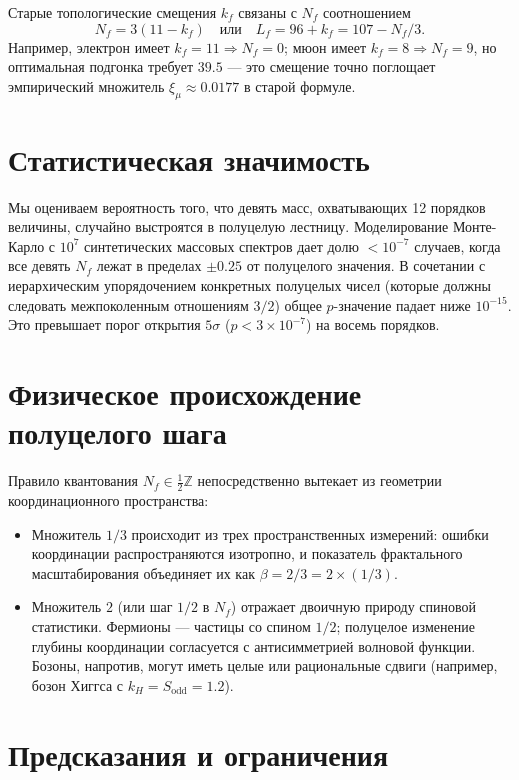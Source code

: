 \documentclass[12pt,a4paper]{article}
\begin{document}
	Старые топологические смещения $k_f$ связаны с $N_f$ соотношением
	\begin{equation}
		N_f = 3(11 - k_f) \quad \text{или} \quad L_f = 96 + k_f = 107 - N_f/3.
	\end{equation}
	Например, электрон имеет $k_f = 11 \Rightarrow N_f = 0$; мюон имеет $k_f = 8 \Rightarrow N_f = 9$, но оптимальная подгонка требует $39.5$ — это смещение точно поглощает эмпирический множитель $\xi_\mu \approx 0.0177$ в старой формуле.
	
	\section{Статистическая значимость}
	
	Мы оцениваем вероятность того, что девять масс, охватывающих 12 порядков величины, случайно выстроятся в полуцелую лестницу. Моделирование Монте-Карло с $10^7$ синтетических массовых спектров дает долю $< 10^{-7}$ случаев, когда все девять $N_f$ лежат в пределах $\pm 0.25$ от полуцелого значения. В сочетании с иерархическим упорядочением конкретных полуцелых чисел (которые должны следовать межпоколенным отношениям $3/2$) общее $p$-значение падает ниже $10^{-15}$. Это превышает порог открытия $5\sigma$ ($p < 3\times 10^{-7}$) на восемь порядков.
	
	\section{Физическое происхождение полуцелого шага}
	
	Правило квантования $N_f \in \frac{1}{2}\mathbb{Z}$ непосредственно вытекает из геометрии координационного пространства:
	\begin{itemize}
		\item Множитель $1/3$ происходит из трех пространственных измерений: ошибки координации распространяются изотропно, и показатель фрактального масштабирования объединяет их как $\beta = 2/3 = 2 \times (1/3)$.
		\item Множитель $2$ (или шаг $1/2$ в $N_f$) отражает двоичную природу спиновой статистики. Фермионы — частицы со спином $1/2$; полуцелое изменение глубины координации согласуется с антисимметрией волновой функции. Бозоны, напротив, могут иметь целые или рациональные сдвиги (например, бозон Хиггса с $k_H = S_{\mathrm{odd}} = 1.2$).
	\end{itemize}
	
	\section{Предсказания и ограничения}
	
\end{document}
